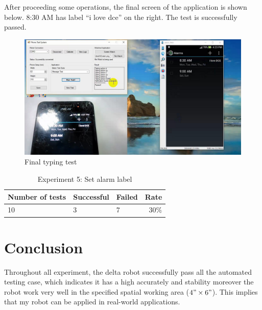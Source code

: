 After proceeding some operations, the final screen of the application is shown below. 8:30 AM has label ``i love dce'' on the right. The test is successfully passed.

	\begin{figure}[H]
		\centering
		\includegraphics[scale=0.5]{Chapters/Fig/label_final.png}
		\caption{Final typing test}
		\label{fig:label_final}
	\end{figure}

\begin{table}[H]
	\centering
	\caption{Experiment 5: Set alarm label}	
	\label{tab:exp3_result_stat}
	\begin{tabular}{|lll|r|}
		\hline
		\textbf{Number of tests} & \textbf{Successful} & \textbf{Failed} & \textbf{Rate} \\
		\hline
		10 & 3 & 7 & 30$\%$\\
		\hline
	\end{tabular}
\end{table}

\section{Conclusion}
Throughout all experiment, the delta robot successfully pass all the automated testing case, which indicates it has a high accurately and stability moreover the robot work very well in the specified spatial working area ($4"\times6"$). This implies that my robot can be applied in real-world applications.

